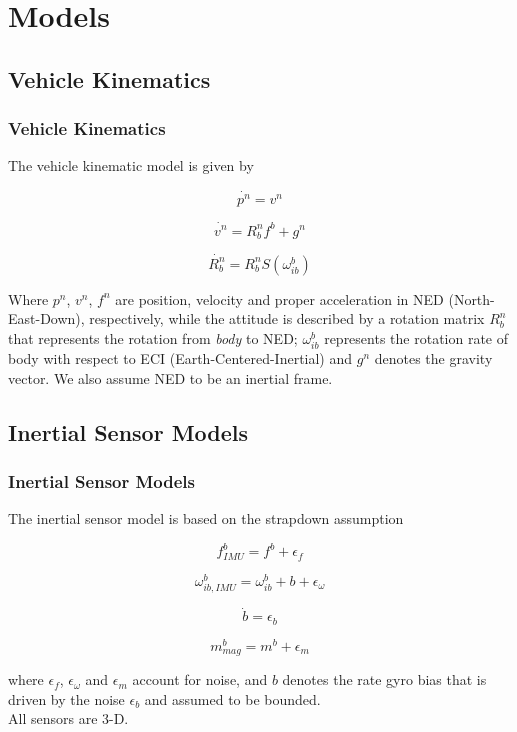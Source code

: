 \documentclass{beamer}
\begin{document}
\section{Models}
    \subsection{Vehicle Kinematics}
	\begin{frame}
	\frametitle{Vehicle Kinematics}
	
	The vehicle kinematic model is given by
	
	\[ \dot{p^n} = v^n \]
	
	\[ \dot{v^n} = R^n_b f^b + g^n\]
	
	\[ \dot{R^n_b} = R^n_bS(\omega^b_{ib}) \]
	
	Where $p^n$, $v^n$, $f^n$ are position, velocity and proper 
	acceleration in NED (North-East-Down), respectively, while the 
	attitude is described by a rotation matrix $R^n_b$ that
	represents the rotation from \textit{body} to NED; $\omega^b_{ib}$
	represents the rotation rate of body with respect to ECI 
	(Earth-Centered-Inertial) and $g^n$ denotes the gravity vector.
	We also assume NED to be an inertial frame. 
	\end{frame}
    \subsection{Inertial Sensor Models}
	\begin{frame}
	\frametitle{Inertial Sensor Models}

	The inertial sensor model is based on the strapdown assumption
	
	\[ f^b_{IMU} = f^b + \epsilon_f\]
	
	\[ \omega^b_{ib,IMU} = \omega^b_{ib} + b + \epsilon_\omega \]
	
	\[ \dot{b} = \epsilon_b \]
	
	\[ m^b_{mag} = m^b + \epsilon_m \]
	
	where $\epsilon_f$, $\epsilon_\omega$ and $\epsilon_m$ account for noise, and $b$ denotes the rate gyro bias that is driven by the noise $\epsilon_b$ and assumed to be bounded.  
	\\ All sensors are 3-D.
	\end{frame}
\end{document}
